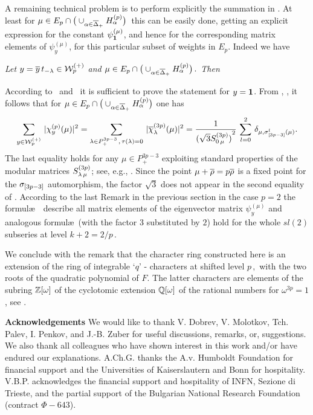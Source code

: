 \medskip

A remaining technical problem is to 
perform explicitly the summation in
\rat. At least for  $\mu\in E_p\cap \big(\cup_{\alpha\in \overline\Delta_+}
H_{\alpha}^{(p)}\big)\,$ this  can be  easily done,  
 getting an explicit expression for the constant
$\psi_{{\bf 1}}^{(\mu)}$, and hence for the corresponding matrix
elements of $\psi_y^{(\mu)}$, for this particular subset
of weights in $E_p$.  Indeed we have

 {\it Let $y = \overline{y} \,t_{-\lambda}\in {\cal W}^{(+)}_p$ and
$\mu \in E_p\cap \big(\cup_{\alpha\in \overline\Delta_+} H_{\alpha}^{(p)}\big)\,.$
Then} 

%
\eqn{}
%
\PROOF According to \rat\ and \red\ it is sufficient to prove
the statement for $y={\bf 1}$. {}From \red, \Vgg,
it follows that for $\mu\in E_p\cap \big(\cup_{\alpha\in \overline\Delta_+}
H_{\alpha}^{(p)}\big)$ one has
%
$$
\sum_{y\in {\cal W}^{(+)}_p}\, |\chi_y^{(p)}(\mu)|^2=\sum_{\lambda\in
P_+^{3p-3}\,, \, \tau(\lambda)=0}\, |\overline{\chi}_{\lambda}^{(3p)}(\mu)|^2
={1\over {(\sqrt{3}
S_{0\,\mu}^{(3p)})}^2}\, \sum_{l=0}^2\, \delta_{\mu,
\sigma_{[3p-3]}^l(\mu)}.  
$$
%
The last  equality holds for any $\mu\in P_+^{3p-3}$ exploiting
standard properties of the modular matrices $S_{\lambda\,\mu}^{(3p)}
$; see, e.g., \PZ.  Since the point $\mu+\overline{\rho} = p\overline{\rho}$ is a fixed
point for the $\sigma_{[3p-3]}$ automorphism, the factor $\sqrt{3}$
does not appear in the second equality of \VIIa.
\endPROOF
According to the last Remark in the previous section in the case
$p=2$ the formul\ae\ \VIIa\ describe all matrix elements of the
eigenvector matrix $\psi_y^{(\mu)}$ and analogous formul\ae\
(with the factor $3$ substituted by $2$) hold for the whole
$sl(2)$ subseries at level $k+2=2/p\,.$



We conclude with the remark that the character ring constructed
here is an extension  of the ring of integrable  `$q$' -
characters at shifted level $p\,, $ with the two roots of
the quadratic polynomial \sqf{} of $F$.  The latter characters
are elements of the subring $\Bbb Z[\omega]$ of the cyclotomic
extension ${\Bbb Q}[\omega]$ of the rational numbers for
$\omega^{3p}=1$, see \BG.



\bigskip
\bigskip

{\bf Acknowledgements}
\medskip
We would like to thank V. Dobrev, V. Molotkov, Tch. Palev, I.
Penkov,  and J.-B. Zuber  for useful discussions, remarks, or,
suggestions. We also thank all colleagues who have shown interest
in this  work and/or have endured our explanations.  A.Ch.G.
thanks the A.v. Humboldt Foundation for financial support and the
Universities of Kaiserslautern and Bonn for hospitality.  V.B.P.
acknowledges the  financial support and hospitality of  INFN,
Sezione di Trieste, and the  partial support of the Bulgarian
National Research Foundation (contract $\Phi-643$).

